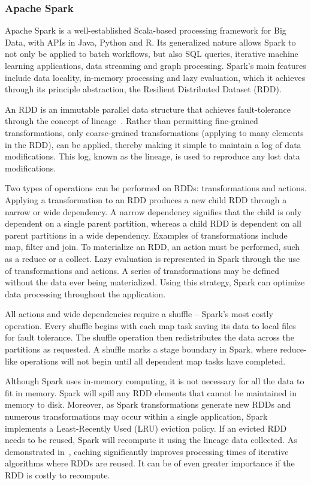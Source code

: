 \subsubsection{Apache Spark}

Apache Spark is a well-established Scala-based processing framework for Big
Data, with APIs in Java, Python and R. Its generalized nature allows Spark to
not only be applied to batch workflows, but also SQL queries, iterative machine
learning applications, data streaming and graph processing. Spark's main
features include data locality, in-memory processing and lazy evaluation, which
it achieves through its principle abstraction, the Resilient Distributed Dataset
(RDD). 

An RDD is an immutable parallel data structure that achieves fault-tolerance
through the concept of lineage~\cite{zaharia2010spark}. Rather than permitting
fine-grained transformations, only coarse-grained transformations (applying to
many elements in the RDD), can be applied, thereby making it simple to maintain
a log of data modifications. This log, known as the lineage, is used to
reproduce any lost data modifications.

Two types of operations can be performed on RDDs: transformations and actions.
Applying a transformation to an RDD produces a new child RDD through a narrow or
wide dependency. A narrow dependency signifies that the child is only dependent
on a single parent partition, whereas a child RDD is dependent on all parent
partitions in a wide dependency. Examples of transformations include map, filter
and join. To materialize an RDD, an action must be performed, such as a reduce
or a collect. Lazy evaluation is represented in Spark through the use of
transformations and actions. A series of transformations may be defined without
the data ever being materialized. Using this strategy, Spark can optimize data
processing throughout the application.

All actions and wide dependencies require a shuffle -- Spark's most costly
operation. Every shuffle begins with each map task saving its data to local
files for fault tolerance. The shuffle operation then redistributes the data
across the partitions as requested. A shuffle marks a stage boundary in Spark,
where reduce-like operations will not begin until all dependent map tasks have
completed.

Although Spark uses in-memory computing, it is not necessary for all the data to
fit in memory. Spark will spill any RDD elements that cannot be maintained in
memory to disk. Moreover, as Spark transformations generate new RDDs and
numerous transformations may occur within a single application, Spark implements
a Least-Recently Used (LRU) eviction policy. If an evicted RDD needs to be
reused, Spark will recompute it using the lineage data collected. As
demonstrated in~\cite{freeman2014mapping}, caching significantly improves
processing times of iterative algorithms where RDDs are reused. It can be of
even greater importance if the RDD is costly to recompute.

